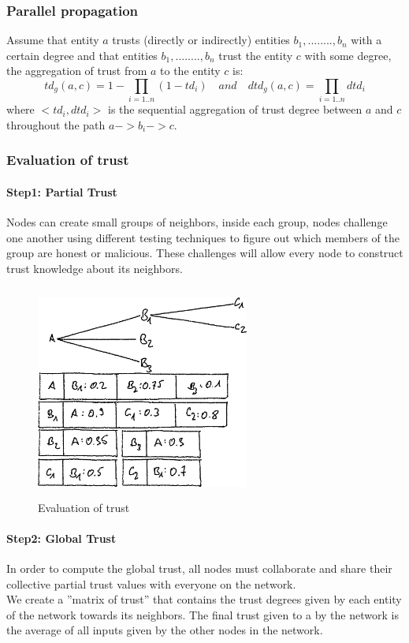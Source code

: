 \subsubsection*{Parallel propagation}
Assume that entity $a$ trusts (directly or indirectly) entities $b_1,........,b_n$ with a certain degree and that entities $b_1,........,b_n$ trust the entity $c$ with some degree, the aggregation of trust from $a$ to the entity $c$ is:
$$td_g(a,c)=1-\prod_{i=1..n}(1-td_i) \quad and \quad dtd_g(a,c)=\prod_{i=1..n}dtd_i$$
where $<td_i,dtd_i>$ is the sequential aggregation of trust degree between $a$ and $c$ throughout the path $a->b_i->c$.

\subsubsection{Evaluation of trust}
\paragraph{Step1: Partial Trust}
Nodes can create small groups of neighbors, inside each group, nodes challenge one another using different testing techniques to figure out which members of the group are honest or malicious. 
These challenges will allow every node to construct trust knowledge about its neighbors. 
\begin{figure}
    \centering
    \includegraphics[width=7cm,height=7cm,keepaspectratio]{../whitepaper/images/reputation.png}
    \caption{Evaluation of trust}
    \label{fig:Evaluation of trust}
\end{figure}

\paragraph{Step2: Global Trust}
In order to compute the global trust, all nodes must collaborate and share their collective partial trust values with everyone on the network. 
\\We create a ”matrix of trust” that contains the trust degrees given by each entity of the network towards its neighbors. 
The final trust given to a by the network is the average of all inputs given by the other nodes in the network.





